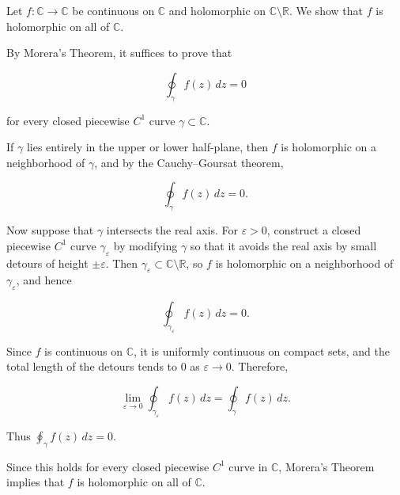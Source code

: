 \documentclass{article}
\begin{document}
\begin{solutions}
		Let $f:\mathbb{C}\to\mathbb{C}$ be continuous on $\mathbb{C}$ and holomorphic on 
		$\mathbb{C}\setminus\mathbb{R}$. We show that $f$ is holomorphic on all of $\mathbb{C}$.
		
		By Morera's Theorem, it suffices to prove that
		
		
		\[
		\oint_{\gamma} f(z)\,dz = 0
		\]
		
		
		for every closed piecewise $C^{1}$ curve $\gamma \subset \mathbb{C}$.
		
		If $\gamma$ lies entirely in the upper or lower half-plane, then $f$ is holomorphic
		on a neighborhood of $\gamma$, and by the Cauchy--Goursat theorem,
		
		
		\[
		\oint_{\gamma} f(z)\,dz = 0.
		\]
		
		
		
		Now suppose that $\gamma$ intersects the real axis.  
		For $\varepsilon>0$, construct a closed piecewise $C^{1}$ curve $\gamma_{\varepsilon}$ 
		by modifying $\gamma$ so that it avoids the real axis by small detours of height 
		$\pm\varepsilon$. Then $\gamma_{\varepsilon}\subset \mathbb{C}\setminus\mathbb{R}$, 
		so $f$ is holomorphic on a neighborhood of $\gamma_{\varepsilon}$, and hence
		
		
		\[
		\oint_{\gamma_{\varepsilon}} f(z)\,dz = 0.
		\]
		
		
		
		Since $f$ is continuous on $\mathbb{C}$, it is uniformly continuous on compact sets, 
		and the total length of the detours tends to $0$ as $\varepsilon\to 0$. Therefore,
		
		
		\[
		\lim_{\varepsilon\to 0} \oint_{\gamma_{\varepsilon}} f(z)\,dz
		= \oint_{\gamma} f(z)\,dz.
		\]
		
		
		Thus $\oint_{\gamma} f(z)\,dz = 0$.
		
		Since this holds for every closed piecewise $C^{1}$ curve in $\mathbb{C}$, 
		Morera's Theorem implies that $f$ is holomorphic on all of $\mathbb{C}$.
\end{solutions}
\end{document}
